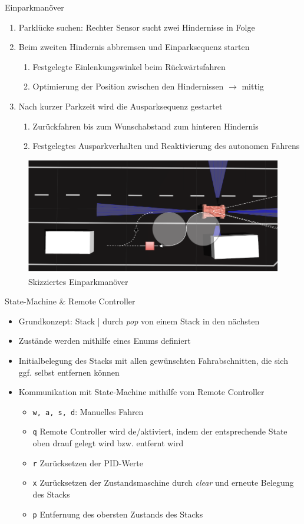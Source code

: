 \documentclass[aspectratio=169]{beamer}
\newcommand{\code}[1]{\textnormal{\lstinline|#1|}}
\newcommand{\enquote}[1]{\glqq{}#1\grqq{}}
\begin{document}
\begin{frame}{Einparkmanöver}
	\begin{enumerate}
		\item Parklücke suchen: Rechter Sensor sucht zwei Hindernisse in Folge
		\item Beim zweiten Hindernis abbremsen und Einparksequenz starten
		      \begin{enumerate}
			      \item Festgelegte Einlenkungswinkel beim Rückwärtsfahren
			      \item Optimierung der Position zwischen den Hindernissen $\rightarrow$ mittig
		      \end{enumerate}
		\item Nach kurzer Parkzeit wird die Ausparksequenz gestartet
		      \begin{enumerate}
			      \item Zurückfahren bis zum Wunschabstand zum hinteren Hindernis
			      \item Festgelegtes Ausparkverhalten und Reaktivierung des autonomen Fahrens
		      \end{enumerate}
	\end{enumerate}
	\begin{figure}
		{\small \caption{Skizziertes Einparkmanöver}}
		\includegraphics[width=.45\textwidth]{img/mett.drawio.pdf}
	\end{figure}
\end{frame}

\begin{frame}{\enquote{State-Machine} \& Remote Controller}
	\begin{itemize}
		\item Grundkonzept: Stack | durch \emph{pop} von einem Stack in den nächsten
		\item Zustände werden mithilfe eines Enums definiert
		\item Initialbelegung des Stacks mit allen gewünschten Fahrabschnitten, die sich ggf. selbst entfernen können
		\item Kommunikation mit State-Machine mithilfe vom Remote Controller
		      \begin{itemize}
			      \item \code{w, a, s, d}: Manuelles Fahren
			      \item \code{q} Remote Controller wird de/aktiviert, indem der entsprechende State oben drauf gelegt wird bzw. entfernt wird
			      \item \code{r} Zurücksetzen der PID-Werte
			      \item \code{x} Zurücksetzen der Zustandsmaschine durch \emph{clear} und erneute Belegung des Stacks
			      \item \code{p} Entfernung des obersten Zustands des Stacks
		      \end{itemize}
	\end{itemize}
\end{frame}
\end{document}
